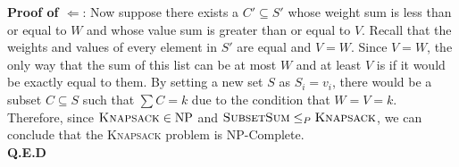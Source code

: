 \textbf{Proof of $\Leftarrow$}:
Now suppose there exists a $C' \subseteq S'$ whose weight sum is less than or equal to $W$ and whose value sum is greater than or equal to $V$. Recall that the weights and values of every element in $S'$ are equal and $V=W$.
Since $V=W$, the only way that the sum of this list can be at most $W$ and at least $V$ is if it would be exactly equal to them.
By setting a new set $S$ as $S_i=v_i$, there would be a subset $C \subseteq S$ such that $\sum C=k$ due to the condition that $W = V = k$. \\

Therefore, since $\textsc{Knapsack} \in \text{NP}$ and $\textsc{SubsetSum} \leq_P \textsc{Knapsack}$, we can conclude that the \textsc{Knapsack} problem is NP-Complete. \\

\textbf{Q.E.D}